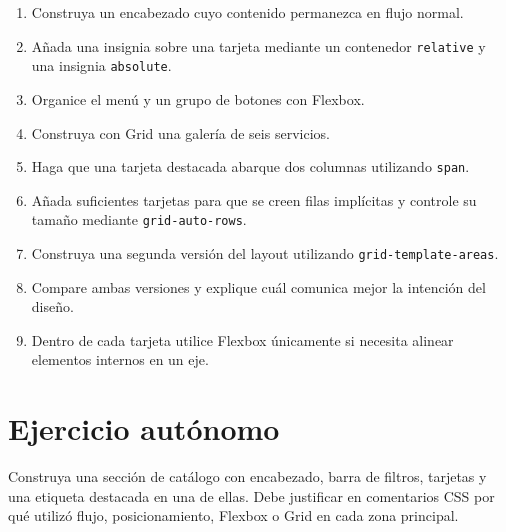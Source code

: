 \documentclass[11pt]{article}
\begin{document}
\begin{enumerate}
    \item Construya un encabezado cuyo contenido permanezca en flujo normal.
    \item Añada una insignia sobre una tarjeta mediante un contenedor
    \texttt{relative} y una insignia \texttt{absolute}.
    \item Organice el menú y un grupo de botones con Flexbox.
    \item Construya con Grid una galería de seis servicios.
    \item Haga que una tarjeta destacada abarque dos columnas utilizando
    \texttt{span}.
    \item Añada suficientes tarjetas para que se creen filas implícitas y controle
    su tamaño mediante \texttt{grid-auto-rows}.
    \item Construya una segunda versión del layout utilizando
    \texttt{grid-template-areas}.
    \item Compare ambas versiones y explique cuál comunica mejor la intención del
    diseño.
    \item Dentro de cada tarjeta utilice Flexbox únicamente si necesita alinear
    elementos internos en un eje.
\end{enumerate}


\section{Ejercicio autónomo}
Construya una sección de catálogo con encabezado, barra de filtros, tarjetas y una etiqueta destacada en una de ellas. Debe justificar en comentarios CSS por qué utilizó flujo, posicionamiento, Flexbox o Grid en cada zona principal.
\end{document}
